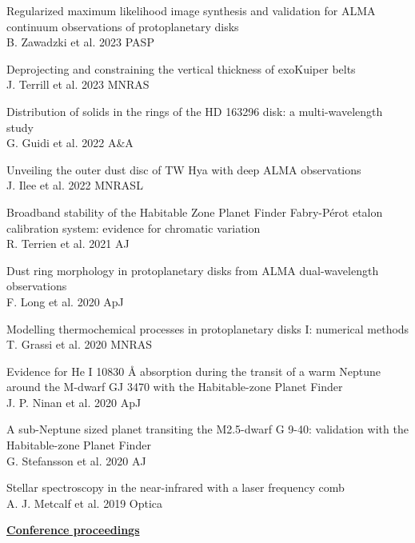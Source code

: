 \documentclass[10pt,preprint]{aastex}
\begin{document}
\noindent Regularized maximum likelihood image synthesis and validation for ALMA continuum
observations of protoplanetary disks \\
\indent B. Zawadzki et al. 2023 PASP

\noindent Deprojecting and constraining the vertical thickness of exoKuiper belts \\
\indent J. Terrill et al. 2023 MNRAS

\noindent Distribution of solids in the rings of the HD 163296 disk: a multi-wavelength study \\
\indent G. Guidi et al. 2022 A\&A 

\noindent Unveiling the outer dust disc of TW Hya with deep ALMA observations \\
\indent J. Ilee et al. 2022 MNRASL

\noindent Broadband stability of the Habitable Zone Planet Finder Fabry-P{\'e}rot etalon calibration system: evidence for chromatic variation \\
\indent R. Terrien et al. 2021 AJ 

\noindent Dust ring morphology in protoplanetary disks from ALMA dual-wavelength observations \\
\indent F. Long et al. 2020 ApJ 

\noindent Modelling thermochemical processes in protoplanetary
disks I: numerical methods \\
\indent T. Grassi et al. 2020 MNRAS

\noindent Evidence for He I 10830 \si{\angstrom} absorption during the transit of a warm Neptune around the M-dwarf GJ 3470 with the Habitable-zone Planet Finder \\
\indent J. P. Ninan et al. 2020 ApJ

\noindent A sub-Neptune sized planet transiting the M2.5-dwarf G 9-40: validation with the Habitable-zone Planet Finder \\
\indent G. Stefansson et al. 2020 AJ

\noindent Stellar spectroscopy in the near-infrared with a laser frequency comb \\
\indent A. J. Metcalf et al. 2019 Optica 

\noindent \underline{{\bf Conference proceedings}} \\
\end{document}
